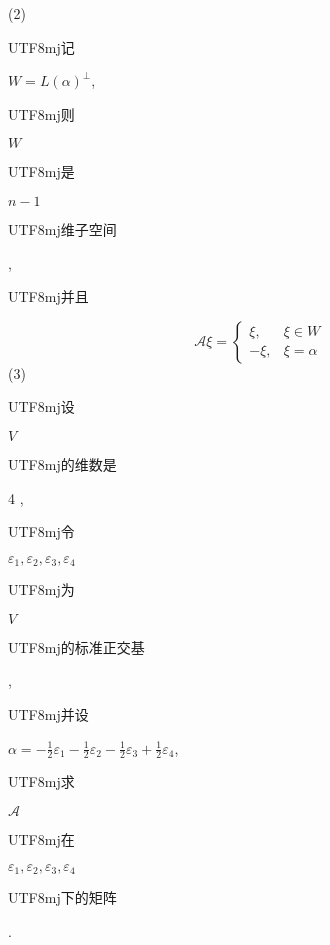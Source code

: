 \documentclass[10pt]{article}
\begin{document}
(2) \begin{CJK}{UTF8}{mj}记\end{CJK} $W=L(\alpha)^{\perp}$, \begin{CJK}{UTF8}{mj}则\end{CJK} $W$ \begin{CJK}{UTF8}{mj}是\end{CJK} $n-1$ \begin{CJK}{UTF8}{mj}维子空间\end{CJK}, \begin{CJK}{UTF8}{mj}并且\end{CJK}
$$
\mathscr{A} \xi= \begin{cases}\xi, & \xi \in W \\ -\xi, & \xi=\alpha\end{cases}
$$
(3) \begin{CJK}{UTF8}{mj}设\end{CJK} $V$ \begin{CJK}{UTF8}{mj}的维数是\end{CJK} 4 , \begin{CJK}{UTF8}{mj}令\end{CJK} $\varepsilon_{1}, \varepsilon_{2}, \varepsilon_{3}, \varepsilon_{4}$ \begin{CJK}{UTF8}{mj}为\end{CJK} $V$ \begin{CJK}{UTF8}{mj}的标准正交基\end{CJK}, \begin{CJK}{UTF8}{mj}并设\end{CJK} $\alpha=-\frac{1}{2} \varepsilon_{1}-\frac{1}{2} \varepsilon_{2}-\frac{1}{2} \varepsilon_{3}+\frac{1}{2} \varepsilon_{4}$, \begin{CJK}{UTF8}{mj}求\end{CJK} $\mathscr{A}$ \begin{CJK}{UTF8}{mj}在\end{CJK} $\varepsilon_{1}, \varepsilon_{2}, \varepsilon_{3}, \varepsilon_{4}$ \begin{CJK}{UTF8}{mj}下的矩阵\end{CJK}.
\end{document}
